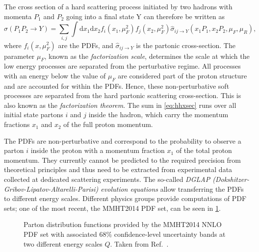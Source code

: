 The cross section of a hard scattering process initiated by two hadrons with momenta $P_1$ and $P_2$ going into a final state Y can therefore be written as
\begin{equation}
  \sigma(P_1P_2 \to Y) = \sum_{i,j} \int \mathrm{d}x_1\mathrm{d}x_2 f_i(x_1,\mu_F^2) f_j(x_2,\mu_F^2) \hat{\sigma}_{ij \rightarrow Y}(x_1P_1,x_2P_2,\mu_F,\mu_R), 
  \label{eq:hhxsec}
\end{equation}
where $f_i(x,\mu_F^2)$ are the PDFs, and $\hat{\sigma}_{ij \rightarrow Y}$ is the partonic cross-section. The parameter $\mu_F$, known as the \emph{factorization scale}, determines the scale at which the low energy processes are separated from the perturbative regime. All processes with an energy below the value of $\mu_F$ are considered part of the proton structure and are accounted for within the PDFs. Hence, these non-perturbative soft processes are separated from the hard partonic scattering cross-section. This is also known as the \emph{factorization theorem}.
The sum in \cref{eq:hhxsec} runs over all initial state partons $i$ and $j$ inside the hadron, which carry the momentum fractions $x_1$ and $x_2$ of the full proton momentum.

The PDFs are non-perturbative and correspond to the probability to observe a parton $i$ inside the proton with a momentum fraction $x_1$ of the total proton momentum.
They currently cannot be predicted to the required precision from theoretical principles and thus need to be extracted from experimental data collected at dedicated scattering experiments.
The so-called \emph{DGLAP (Dokshitzer-Gribov-Lipatov-Altarelli-Parisi) evolution equations} \cite{Dokshitzer:1977sg,GRIBOV197178,Altarelli:1977zs} allow transferring the PDFs to different energy scales.
Different physics groups provide computations of PDF sets; one of the most recent, the MMHT2014 PDF set, can be seen in \cref{fig:pdfs}. 

\begin{figure}
  \caption[Parton distribution functions provided by the MMHT2014 NNLO PDF set with associated 68\% confidence-level uncertainty bands at two different energy scales $Q$.]{Parton distribution functions provided by the MMHT2014 NNLO PDF set with associated 68\% confidence-level uncertainty bands at two different energy scales $Q$. Taken from Ref.~\cite{Harland-Lang:2014zoa}.}
  \label{fig:pdfs}
\end{figure}


